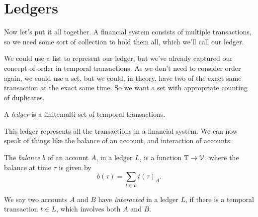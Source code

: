 \section{Ledgers}

Now let's put it all together.
A financial system consists of multiple transactions, so we need some sort of collection to hold them all,
which we'll call our ledger.

We could use a list to represent our ledger, but we've already captured our concept of order in temporal transactions.
As we don't need to consider order again, we could use a set,
but we could, in theory, have two of the exact same transaction at the exact same time.
So we want a set with appropriate counting of duplicates.

\begin{definition}
    A \emph{ledger} is a finite\footnotemark multi-set of temporal transactions.
\end{definition}

This ledger represents all the transactions in a financial system.
We can now speak of things like the balance of an account, and interaction of accounts.

\begin{definition}
    The \emph{balance} $b$ of an account $A$, in a ledger $L$, is a function $\mathbb{T} \to \mathcal{V}$,
    where the balance at time $\tau$ is given by
    \begin{equation*}
        b(\tau) = \sum_{t \in L} t(\tau)_A.
    \end{equation*}
\end{definition}

\begin{definition}
    We say two accounts $A$ and $B$ have \emph{interacted} in a ledger $L$,
    if there is a temporal transaction $t \in L$, which involves both $A$ and $B$.
\end{definition}
